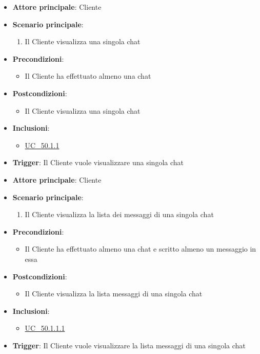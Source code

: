 \begin{itemize}
	\item \textbf{Attore principale}: Cliente
	\item \textbf{Scenario principale}:
	\begin{enumerate}
		\item Il Cliente visualizza una singola chat 
	\end{enumerate}
	\item \textbf{Precondizioni}:
	\begin{itemize}
		\item Il Cliente ha effettuato almeno una chat
	\end{itemize}
	\item \textbf{Postcondizioni}:
	\begin{itemize}
		\item Il Cliente visualizza una singola chat
	\end{itemize}
	\item \textbf{Inclusioni}:
	\begin{itemize}
		\item \hyperref[uc_50.1.1]{UC\_50.1.1}
	\end{itemize}
	\item \textbf{Trigger}: Il Cliente vuole visualizzare una singola chat 
\end{itemize}

\label{uc_50.1.1}

\begin{itemize}
	\item \textbf{Attore principale}: Cliente
	\item \textbf{Scenario principale}:
	\begin{enumerate}
		\item Il Cliente visualizza la lista dei messaggi di una singola chat
	\end{enumerate}
	\item \textbf{Precondizioni}:
	\begin{itemize}
		\item Il Cliente ha effettuato almeno una chat e scritto almeno un messaggio in essa
	\end{itemize}
	\item \textbf{Postcondizioni}:
	\begin{itemize}
		\item Il Cliente visualizza la lista messaggi di una singola chat 
	\end{itemize}
	\item \textbf{Inclusioni}:
	\begin{itemize}
		\item \hyperref[uc_50.1.1.1]{UC\_50.1.1.1}
	\end{itemize}
	\item \textbf{Trigger}: Il Cliente vuole visualizzare la lista messaggi di una singola chat
\end{itemize}

